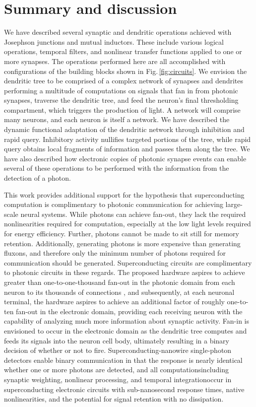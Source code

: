 \documentclass[twocolumn]{article}
\begin{document}
\section{\label{sec:discussion}Summary and discussion}
We have described several synaptic and dendritic operations achieved with Josephson junctions and mutual inductors. These include various logical operations, temporal filters, and nonlinear transfer functions applied to one or more synapses. The operations performed here are all accomplished with configurations of the building blocks shown in Fig.\,\ref{fig:circuits}. We envision the dendritic tree to be comprised of a complex network of synapses and dendrites performing a multitude of computations on signals that fan in from photonic synapses, traverse the dendritic tree, and feed the neuron's final thresholding compartment, which triggers the production of light. A network will comprise many neurons, and each neuron is itself a network. We have described the dynamic functional adaptation of the dendritic network through inhibition and rapid query. Inhibitory activity nullifies targeted portions of the tree, while rapid query obtains local fragments of information and passes them along the tree. We have also described how electronic copies of photonic synapse events can enable several of these operations to be performed with the information from the detection of a photon. 

This work provides additional support for the hypothesis that superconducting computation is complimentary to photonic communication for achieving large-scale neural systems. While photons can achieve fan-out, they lack the required nonlinearities required for computation, especially at the low light levels required for energy efficiency. Further, photons cannot be made to sit still for memory retention. Additionally, generating photons is more expensive than generating fluxons, and therefore only the minimum number of photons required for communication should be generated. Superconducting circuits are complimentary to photonic circuits in these regards. The proposed hardware aspires to achieve greater than one-to-one-thousand fan-out in the photonic domain from each neuron to its thousands of connections \cite{sh2018_ICRC}, and subsequently, at each neuronal terminal, the hardware aspires to achieve an additional factor of roughly one-to-ten fan-out in the electronic domain, providing each receiving neuron with the capability of analyzing much more information about synaptic activity. Fan-in is envisioned to occur in the electronic domain as the dendritic tree computes and feeds its signals into the neuron cell body, ultimately resulting in a binary decision of whether or not to fire. Superconducting-nanowire single-photon detectors enable binary communication in that the response is nearly identical whether one or more photons are detected, and all computations\textemdash including synaptic weighting, nonlinear processing, and temporal integration\textemdash occur in superconducting electronic circuits with sub-nanosecond response times, native nonlinearities, and the potential for signal retention with no dissipation.
 
\end{document}
